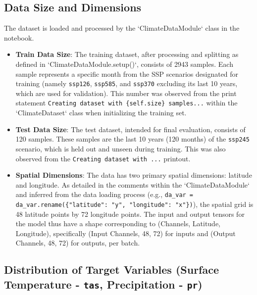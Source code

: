 \documentclass{article}
\begin{document}
\subsection{Data Size and Dimensions}

The dataset is loaded and processed by the `ClimateDataModule` class in the notebook.
\begin{itemize}
    \item \textbf{Train Data Size}: The training dataset, after processing and splitting as defined in `ClimateDataModule.setup()`, consists of 2943 samples. Each sample represents a specific month from the SSP scenarios designated for training (namely \texttt{ssp126}, \texttt{ssp585}, and \texttt{ssp370} excluding its last 10 years, which are used for validation). This number was observed from the print statement \texttt{Creating dataset with \{self.size\} samples...} within the `ClimateDataset` class when initializing the training set.
    \item \textbf{Test Data Size}: The test dataset, intended for final evaluation, consists of 120 samples. These samples are the last 10 years (120 months) of the \texttt{ssp245} scenario, which is held out and unseen during training. This was also observed from the \texttt{Creating dataset with ...} printout.
    \item \textbf{Spatial Dimensions}: The data has two primary spatial dimensions: latitude and longitude. As detailed in the comments within the `ClimateDataModule` and inferred from the data loading process (e.g., \verb|da_var = da_var.rename({"latitude": "y", "longitude": "x"})|), the spatial grid is 48 latitude points by 72 longitude points. The input and output tensors for the model thus have a shape corresponding to (Channels, Latitude, Longitude), specifically (Input Channels, 48, 72) for inputs and (Output Channels, 48, 72) for outputs, per batch.
\end{itemize}

\subsection{Distribution of Target Variables (Surface Temperature - \texttt{tas}, Precipitation - \texttt{pr})}
\end{document}
